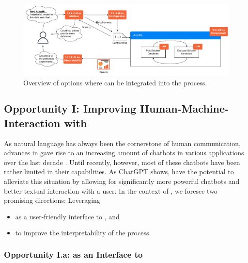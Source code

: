 \begin{figure}
    \centering
    \includegraphics[width=1.\textwidth]{chapters/human-centric/llm/img/llms_for_automl_overview_3.pdf}
    \caption{Overview of options where \LLMs can be integrated into the \AutoML process.}
    \label{llm-fig:llms_for_automl_overview}
\end{figure}

\subsection{Opportunity I: Improving Human-Machine-Interaction with \LLMs}
\label{llm-ssec:hmi-with-llms}

As natural language has always been the cornerstone of human communication, advances in \NLP gave rise to an increasing amount of chatbots in various applications over the last decade \cite{adamopoulou-mla20}. Until recently, however, most of these chatbots have been rather limited in their capabilities. As ChatGPT \cite{openai-openai22a} shows, \LLMs have the potential to alleviate this situation by allowing for significantly more powerful chatbots and better textual interaction with a user. In the context of \AutoML, we foresee two promising directions: Leveraging \LLMs
\begin{itemize}
    \item as a user-friendly interface to \AutoML, and
    \item to improve the interpretability of the \AutoML process.
\end{itemize}


\subsubsection{Opportunity I.a:  \LLMs as an Interface to \AutoML}
\label{llm-ssec:llms-as-interface-to-automl}


